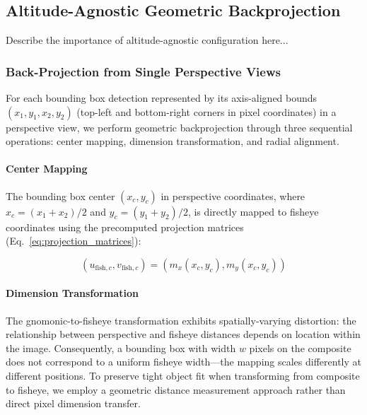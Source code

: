 \documentclass[twocolumn]{svjour3}          %
\begin{document}
\subsection{Altitude-Agnostic Geometric Backprojection}

Describe the importance of altitude-agnostic configuration here...

\subsubsection{Back-Projection from Single Perspective Views}
\label{sec:backproj_single}

For each bounding box detection represented by its axis-aligned bounds $(x_1, y_1, x_2, y_2)$ (top-left and bottom-right corners in pixel coordinates) in a perspective view, we perform geometric backprojection through three sequential operations: center mapping, dimension transformation, and radial alignment.

\paragraph{Center Mapping}

The bounding box center $(x_c, y_c)$ in perspective coordinates, where $x_c = (x_1 + x_2)/2$ and $y_c = (y_1 + y_2)/2$, is directly mapped to fisheye coordinates using the precomputed projection matrices (Eq.~\ref{eq:projection_matrices}):

\begin{equation}
    (u_{\text{fish},c}, v_{\text{fish},c}) = (m_x(x_c, y_c), m_y(x_c, y_c))
    \label{eq:center_backproj}
\end{equation}

\paragraph{Dimension Transformation}

The gnomonic-to-fisheye transformation exhibits spatially-varying distortion: the relationship between perspective and fisheye distances depends on location within the image. Consequently, a bounding box with width $w$ pixels on the composite does not correspond to a uniform fisheye width—the mapping scales differently at different positions. To preserve tight object fit when transforming from composite to fisheye, we employ a geometric distance measurement approach rather than direct pixel dimension transfer.
\end{document}
